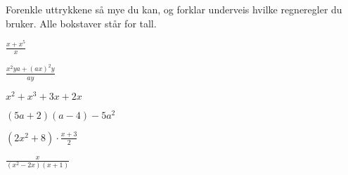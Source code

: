 \documentclass[a4paper,11pt]{article}
\begin{document}

\begin{problem}
    Forenkle uttrykkene så mye du kan, og forklar underveis hvilke regneregler 
    du bruker. Alle bokstaver står for tall.
    \begin{subproblem}{2}
        \item $\displaystyle \frac{x + x^5}{x}$
          \label{subproblem:MAT-0001-Problem-1-x-5-a}
        \item $\displaystyle \frac{x^2 ya + (ax)^2 y}{ay}$
          \label{subproblem:MAT-0001-Problem-1-x-5-b}
    \end{subproblem}
    \begin{subproblem}[3]{2}
        \item $\displaystyle x^2 + x^3 + 3x + 2x$
          \label{subproblem:MAT-0001-Problem-1-x-5-c}
        \item $\displaystyle (5a + 2)(a - 4) - 5a^2$
          \label{subproblem:MAT-0001-Problem-1-x-5-d}
    \end{subproblem}
    \begin{subproblem}[5]{2}
        \item $\displaystyle (2x^2 + 8) \cdot \frac{x+3}{2}$
          \label{subproblem:MAT-0001-Problem-1-x-5-e}
        \item $\displaystyle \frac{x}{(x^2 - 2x)(x + 1)}$
          \label{subproblem:MAT-0001-Problem-1-x-5-f}
    \end{subproblem}
\end{problem}
\end{document}

